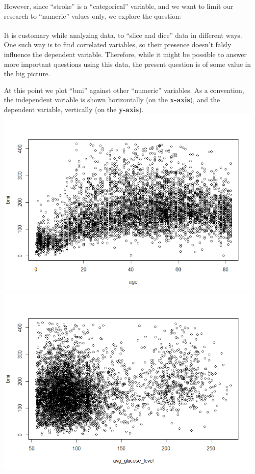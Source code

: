 \documentclass{article}
\begin{document}
However, since ``stroke'' is a ``categorical'' variable, and we want to limit our research 
to ``numeric'' values only, we explore the question:\\

\\

It is customary while analyzing data, to ``slice and dice''
data in different ways. One such way is to find correlated 
variables, so their presence doesn't falsly influence the 
dependent variable. Therefore, while it might be possible 
to answer more important questions using this data, 
the present question is of some value in the big picture.
\pagebreak

At this point we plot ``bmi'' against other ``numeric'' variables.
As a convention, the independent variable is shown horizontally
(on the \textbf{x-axis}), and the dependent variable,
vertically (on the \textbf{y-axis}).\\
\includegraphics[scale=.5]{bmi-age}\\
\includegraphics[scale=.5]{bmi-avg_glucose_level}\\
\end{document}
